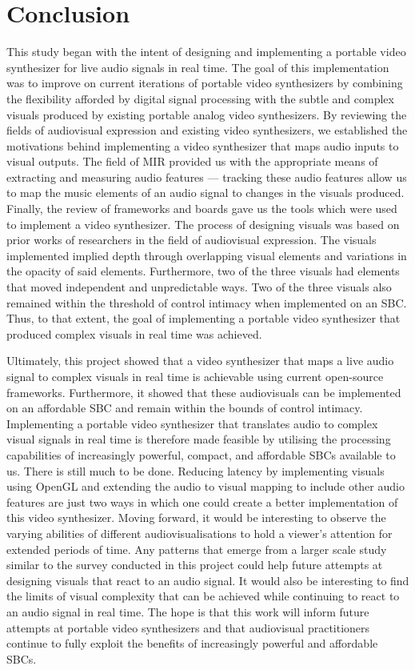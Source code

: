 \documentclass{report}
\begin{document}
\chapter{Conclusion}
This study began with the intent of designing and implementing a portable video synthesizer for live audio signals in real time. The goal of this implementation was to improve on current iterations of portable video synthesizers by combining the flexibility afforded by digital signal processing with the subtle and complex visuals produced by existing portable analog video synthesizers. By reviewing the fields of audiovisual expression and existing video synthesizers, we established the motivations behind implementing a video synthesizer that maps audio inputs to visual outputs. The field of MIR provided us with the appropriate means of extracting and measuring audio features --- tracking these audio features allow us to map the music elements of an audio signal to changes in the visuals produced. Finally, the review of frameworks and boards gave us the tools which were used to implement a video synthesizer. The process of designing visuals was based on prior works of researchers in the field of audiovisual expression. The visuals implemented implied depth through overlapping visual elements and variations in the opacity of said elements. Furthermore, two of the three visuals had elements that moved independent and unpredictable ways. Two of the three visuals also remained within the threshold of control intimacy when implemented on an SBC. Thus, to that extent, the goal of implementing a portable video synthesizer that produced complex visuals in real time was achieved.

Ultimately, this project showed that a video synthesizer that maps a live audio signal to complex visuals in real time is achievable using current open-source frameworks. Furthermore, it showed that these audiovisuals can be implemented on an affordable SBC and remain within the bounds of control intimacy. Implementing a portable video synthesizer that translates audio to complex visual signals in real time is therefore made feasible by utilising the processing capabilities of increasingly powerful, compact, and affordable SBCs available to us. There is still much to be done. Reducing latency by implementing visuals using OpenGL and extending the audio to visual mapping to include other audio features are just two ways in which one could create a better implementation of this video synthesizer. Moving forward, it would be interesting to observe the varying abilities of different audiovisualisations to hold a viewer's attention for extended periods of time. Any patterns that emerge from a larger scale study similar to the survey conducted in this project could help future attempts at designing visuals that react to an audio signal. It would also be interesting to find the limits of visual complexity that can be achieved while continuing to react to an audio signal in real time. The hope is that this work will inform future attempts at portable video synthesizers and that audiovisual practitioners continue to fully exploit the benefits of increasingly powerful and affordable SBCs.

\printbibliography[heading=bibintoc, title={Bibliography}] %

\begin{appendices}
  
\end{appendices}
\end{document}
